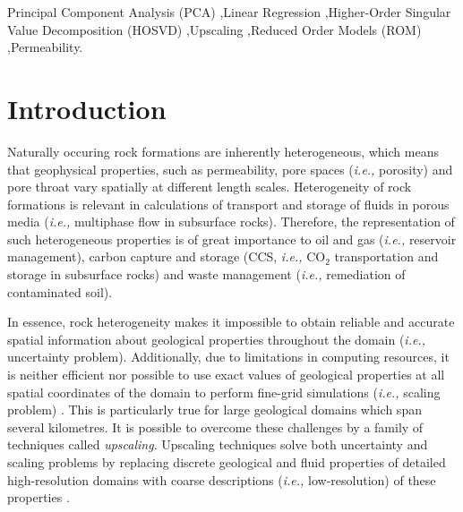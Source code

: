 \documentclass[preprint,12pt]{elsarticle}
\newcommand{\red}{\textcolor{red}}
\newcommand{\ie}{{\it i.e., }}
\begin{document}
\begin{frontmatter}
\begin{abstract}
It was shown that the new upscaling technique retained the heterogenous nature of the BaseCase (\ie high-resolution configuration). Additionally, the upscaling technique did not require {\it a priori} understanding of similar permeability blocks within the existing domain.  \red{Later}

\end{abstract}



\begin{keyword} %
Principal Component Analysis (PCA) \sep Linear Regression \sep Higher-Order Singular Value Decomposition (HOSVD) \sep Upscaling \sep Reduced Order Models (ROM) \sep Permeability.  
\end{keyword}
 
\end{frontmatter}

\section{Introduction}\label{section:intro}
Naturally occuring rock formations are inherently heterogeneous, which means that geophysical properties, such as permeability, pore spaces (\ie porosity) and pore throat vary spatially at different length scales. Heterogeneity of rock formations is relevant in calculations of transport and storage of fluids in porous media (\ie multiphase flow in subsurface rocks). Therefore, the representation of such heterogeneous properties is of great importance to oil and gas (\ie reservoir management), carbon capture and storage (CCS, \ie CO$_2$ transportation and storage in subsurface rocks) and waste management (\ie remediation of contaminated soil).

In essence, rock heterogeneity makes it impossible to obtain reliable and accurate spatial information about geological properties throughout the domain (\ie uncertainty problem). Additionally, due to limitations in computing resources, it is neither efficient nor possible to use exact values of geological properties at all spatial coordinates of the domain to perform fine-grid simulations (\ie scaling problem) \cite{chen_2006,miller_1998,Renard_1997}. This is particularly true for large geological domains which span several kilometres. It is possible to overcome these challenges by a family of techniques called {\it upscaling}. Upscaling techniques solve both uncertainty and scaling problems by replacing discrete geological and fluid properties of detailed high-resolution domains with coarse descriptions (\ie low-resolution) of these properties \cite{Vereecken_2007}.
\end{document}
